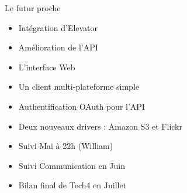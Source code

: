 \documentclass{beamer}
\begin{document}
\begin{frame}{Le futur proche}
\begin{itemize}
   \item Intégration d'Elevator
   \item Amélioration de l'API
   \item L'interface Web
   \item Un client multi-plateforme simple
   \item Authentification OAuth pour l'API
   \item Deux nouveaux drivers : Amazon S3 et Flickr
  \item Suivi Mai à 22h (William)
  \item Suivi Communication en Juin
  \item Bilan final de Tech4 en Juillet
\end{itemize}
\end{frame}
\end{document}
